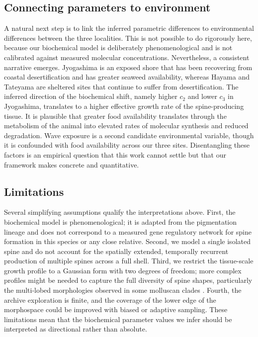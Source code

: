 \documentclass[11pt]{article}
\begin{document}
\subsection{Connecting parameters to environment}

A natural next step is to link the inferred parametric differences to
environmental differences between the three localities. This is not
possible to do rigorously here, because our biochemical model is
deliberately phenomenological and is not calibrated against measured
molecular concentrations. Nevertheless, a consistent narrative emerges.
Jyogashima is an exposed shore that has been recovering from coastal
desertification and has greater seaweed availability, whereas Hayama and
Tateyama are sheltered sites that continue to suffer from desertification.
The inferred direction of the biochemical shift, namely higher $c_2$ and
lower $c_3$ in Jyogashima, translates to a higher effective growth rate
of the spine-producing tissue. It is plausible that greater food
availability translates through the metabolism of the animal into
elevated rates of molecular synthesis and reduced degradation. Wave
exposure is a second candidate environmental variable, though it is
confounded with food availability across our three sites. Disentangling
these factors is an empirical question that this work cannot settle but
that our framework makes concrete and quantitative.

\subsection{Limitations}

Several simplifying assumptions qualify the interpretations above. First,
the biochemical model is phenomenological; it is adapted from the
pigmentation lineage \citep{fowler1992modeling,meinhardt1987model} and
does not correspond to a measured gene regulatory network for spine
formation in this species or any close relative. Second, we model a
single isolated spine and do not account for the spatially extended,
temporally recurrent production of multiple spines across a full shell.
Third, we restrict the tissue-scale growth profile to a Gaussian form with
two degrees of freedom; more complex profiles might be needed to capture
the full diversity of spine shapes, particularly the multi-lobed
morphologies observed in some molluscan clades
\citep{chirat2013mechanical}. Fourth, the archive exploration is finite,
and the coverage of the lower edge of the morphospace could be improved
with biased or adaptive sampling. These limitations mean that the
biochemical parameter values we infer should be interpreted as directional
rather than absolute.
\end{document}
